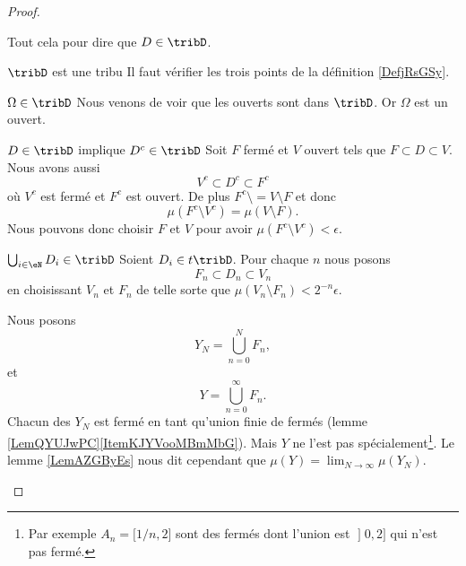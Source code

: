 \begin{proof}
\begin{subproof}
            Tout cela pour dire que \( D\in\tribD\).
        \item[\( \tribD\) est une tribu]
            Il faut vérifier les trois points de la définition \ref{DefjRsGSy}.
            \begin{subproof}
                \item[\( \Omega\in\tribD\)]
                    Nous venons de voir que les ouverts sont dans \( \tribD\). Or \( \Omega\) est un ouvert.
                \item[\( D\in \tribD\) implique \( D^c\in \tribD\)]
                    Soit \( F\) fermé et \( V\) ouvert tels que \( F\subset D\subset V\). Nous avons aussi
                    \begin{equation}
                        V^c\subset D^c\subset F^c
                    \end{equation}
                    où \( V^c\) est fermé et \( F^c\) est ouvert. De plus \( F^c\setminus = V\setminus F\) et donc
                    \begin{equation}
                        \mu(F^c\setminus V^c)=\mu(V\setminus F).
                    \end{equation}
                    Nous pouvons donc choisir \( F\) et \( V\) pour avoir \( \mu(F^c\setminus V^c)<\epsilon\).
                \item[\( \bigcup_{i\in \eN}D_i\in\tribD\)]
                    Soient \( D_i\in t\tribD\). Pour chaque \( n\) nous posons
                    \begin{equation}
                        F_n\subset D_n\subset V_n
                    \end{equation}
                    en choisissant \( V_n\) et \( F_n\) de telle sorte que \( \mu(V_n\setminus F_n)<2^{-n}\epsilon\).

                    Nous posons 
                    \begin{equation}
                        Y_N=\bigcup_{n=0}^NF_n,
                    \end{equation}
                    et
                    \begin{equation}
                        Y=\bigcup_{n=0}^{\infty}F_n.
                    \end{equation}
                    Chacun des \( Y_N\) est fermé en tant qu'union finie de fermés (lemme \ref{LemQYUJwPC}\ref{ItemKJYVooMBmMbG}). Mais \( Y\) ne l'est pas spécialement\footnote{Par exemple \( A_n=\mathopen[ 1/n , 2 \mathclose]\) sont des fermés dont l'union est \( \mathopen] 0 , 2 \mathclose]\) qui n'est pas fermé.}. Le lemme \ref{LemAZGByEs} nous dit cependant que \( \mu(Y)=\lim_{N\to \infty} \mu(Y_N)\).


\end{subproof}
\end{subproof}
\end{proof}
